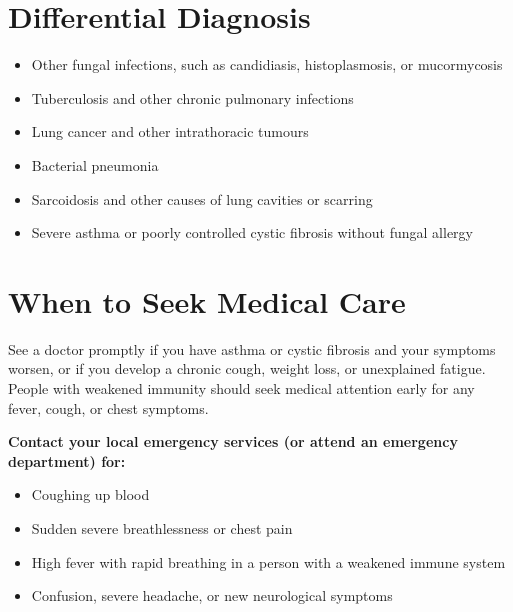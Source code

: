 \section*{Differential Diagnosis}
\begin{itemize}
    \item Other fungal infections, such as candidiasis, histoplasmosis, or mucormycosis
    \item Tuberculosis and other chronic pulmonary infections
    \item Lung cancer and other intrathoracic tumours
    \item Bacterial pneumonia
    \item Sarcoidosis and other causes of lung cavities or scarring
    \item Severe asthma or poorly controlled cystic fibrosis without fungal allergy
\end{itemize}

\section*{When to Seek Medical Care}
See a doctor promptly if you have asthma or cystic fibrosis and your symptoms worsen, or if you develop a chronic cough, weight loss, or unexplained fatigue. People with weakened immunity should seek medical attention early for any fever, cough, or chest symptoms.

\textbf{Contact your local emergency services (or attend an emergency department) for:}
\begin{itemize}
    \item Coughing up blood
    \item Sudden severe breathlessness or chest pain
    \item High fever with rapid breathing in a person with a weakened immune system
    \item Confusion, severe headache, or new neurological symptoms
\end{itemize}

